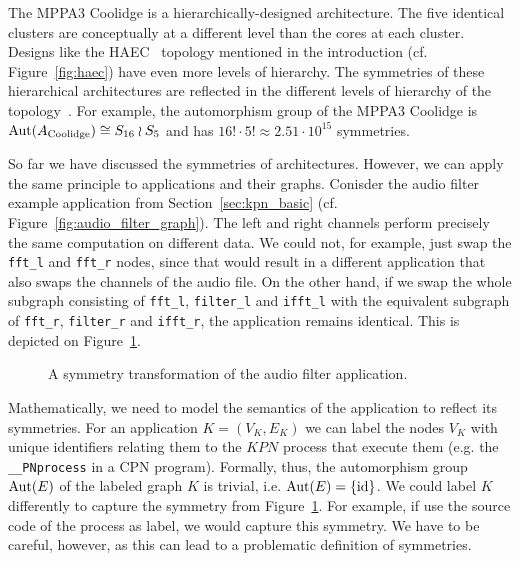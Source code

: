 The MPPA3 Coolidge is a hierarchically-designed architecture. The five identical clusters are conceptually at a different level than the cores at each cluster.
Designs like the HAEC~\cite{HAEC} topology mentioned in the introduction (cf. Figure~\ref{fig:haec}) have even more levels of hierarchy.
The symmetries of these hierarchical architectures are reflected in the different levels of hierarchy of the topology~\cite{goens_tcad21}.
For example, the automorphism group of the MPPA3 Coolidge is $\operatorname{Aut}(A_\text{Coolidge}) \cong S_{16} \wr S_5$ and has $16! \cdot 5! \approx 2.51 \cdot 10^{15}$ symmetries. 

So far we have discussed the symmetries of architectures.
However, we can apply the same principle to applications and their graphs.
Conisder the audio filter example application from Section~\ref{sec:kpn_basic} (cf. Figure~\ref{fig:audio_filter_graph}). 
The left and right channels perform precisely the same computation on different data.
We could not, for example, just swap the \texttt{fft\_l} and \texttt{fft\_r} nodes, since that would result in a different application that also swaps the channels of the audio file.
On the other hand, if we swap the whole subgraph consisting of \texttt{fft\_l}, \texttt{filter\_l} and \texttt{ifft\_l} with the equivalent subgraph of \texttt{fft\_r}, \texttt{filter\_r} and \texttt{ifft\_r}, the application remains identical.
This is depicted on Figure~\ref{fig:audio_filter_symmetries}.

\begin{figure}[h]
	\centering
\resizebox{0.9\textwidth}{!}{
\begin{tikzpicture}
   
 \end{tikzpicture}
}
   \caption{A symmetry transformation of the audio filter application.}
	\label{fig:audio_filter_symmetries}
\end{figure}

Mathematically, we need to model the semantics of the application to reflect its symmetries.
For an application $K = (V_K,E_K)$ we can label the nodes $V_K$ with unique identifiers relating them to the $KPN$ process that execute them (e.g. the \texttt{\_\_PNprocess} in a \ac{CPN} program). 
Formally, thus, the automorphism group $\operatorname{Aut}(E)$ of the labeled graph $K$ is trivial, i.e. $\operatorname{Aut}(E) = \{ \operatorname{id} \}$. 
We could label $K$ differently to capture the symmetry from Figure~\ref{fig:audio_filter_symmetries}.
For example, if use the source code of the process as label, we would capture this symmetry.
We have to be careful, however, as this can lead to a problematic definition of symmetries.

